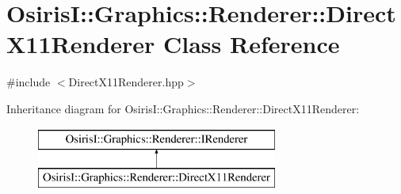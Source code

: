 \hypertarget{class_osiris_i_1_1_graphics_1_1_renderer_1_1_direct_x11_renderer}{\section{Osiris\-I\-:\-:Graphics\-:\-:Renderer\-:\-:Direct\-X11\-Renderer Class Reference}
\label{class_osiris_i_1_1_graphics_1_1_renderer_1_1_direct_x11_renderer}
}


{\ttfamily \#include $<$Direct\-X11\-Renderer.\-hpp$>$}

Inheritance diagram for Osiris\-I\-:\-:Graphics\-:\-:Renderer\-:\-:Direct\-X11\-Renderer\-:\begin{figure}[H]
\begin{center}
\leavevmode
\includegraphics[height=2.000000cm]{class_osiris_i_1_1_graphics_1_1_renderer_1_1_direct_x11_renderer}
\end{center}
\end{figure}
